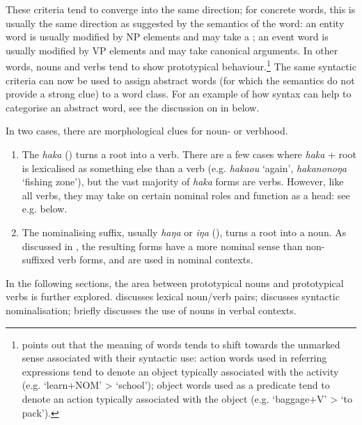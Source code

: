These criteria tend to converge into the same direction; for concrete words, this is usually the same direction as suggested by the semantics of the word: an entity word is usually modified by NP elements and may take a ; an event word is usually modified by VP elements and may take canonical arguments. In other words, nouns and verbs tend to show prototypical behaviour.\footnote{\label{fn:97}\citet[96]{Croft2000} points out that the meaning of words tends to shift towards the unmarked sense associated with their syntactic use: action words used in referring expressions tend to denote an object typically associated with the activity (e.g. ‘learn+NOM’ {\textgreater} ‘school’); object words used as a predicate tend to denote an action typically associated with the object (e.g. ‘baggage+V’ {\textgreater} ‘to pack’).} The same syntactic criteria can now be used to assign abstract words (for which the semantics do not provide a strong clue) to a word class. For an example of how syntax can help to categorise an abstract word, see the discussion on  in  below.

In two cases, there are morphological clues for noun- or verbhood.

\begin{enumerate}
\item 
The   \textit{haka} () turns a root into a verb. There are a few cases where \textit{haka} + root is lexicalised as something else than a verb (e.g. \textit{haka{\ꞌ}ou} ‘again’, \textit{hakanonoŋa} ‘fishing zone’), but the vast majority of \textit{haka} forms are verbs. However, like all verbs, they may take on certain nominal roles and function as a  head: see e.g.  below.

\item 
The nominalising suffix, usually \textit{haŋa} or \textit{iŋa} (), turns a root into a noun. As discussed in , the resulting forms have a more nominal sense than non-suffixed verb forms, and are used in nominal contexts.

\end{enumerate}

In the following sections, the area between prototypical nouns and prototypical verbs is further explored.  discusses lexical noun/verb pairs;  discusses syntactic nominalisation;  briefly discusses the use of nouns in verbal contexts.

